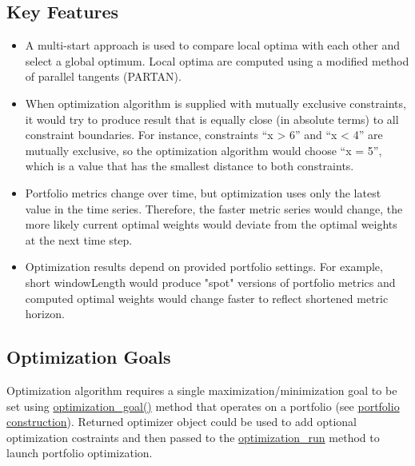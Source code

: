 \documentclass[letterpaper]{report}
\newcounter{N}
\begin{document}
\subsection{Key Features}
\begin{itemize} 
  \item A multi-start approach is used to compare local optima with each other and select a global optimum. 
		Local optima are computed using a modified method of parallel tangents (PARTAN).
  \item When optimization algorithm is supplied with mutually exclusive constraints, it would try to produce result that is equally close (in absolute terms) to all constraint boundaries. 
		For instance, constraints ``x > 6'' and ``x < 4'' are mutually exclusive, so
		the optimization algorithm would choose ``x = 5'', which is a value that has the smallest distance to both constraints.
  \item Portfolio metrics change over time, but optimization uses only the latest value in the time series.
		Therefore, the faster metric series would change, the more likely current optimal weights would deviate
		from the optimal weights at the next time step. 
  \item Optimization results depend on provided portfolio settings. 
		For example, short windowLength would produce "spot" versions of portfolio metrics and 
		computed optimal weights would change faster to reflect shortened metric horizon. 
\end{itemize}

\subsection{Optimization Goals}
Optimization algorithm requires a single maximization/minimization goal to be set using 
\href{https://www.portfolioeffect.com/docs/platform/quant/functions/optimization-functions/optimization-goal}{optimization\_goal()}
method that operates on a portfolio (see
\href{https://www.portfolioeffect.com/docs/platform/quant/manuals/portfolio-construction}{portfolio
construction}).
Returned optimizer object could be used to add optional optimization costraints and then passed to the 
\href{https://www.portfolioeffect.com/docs/platform/quant/functions/optimization-functions/optimization-run}{optimization\_run}
method to launch portfolio optimization.
\par
\end{document}
